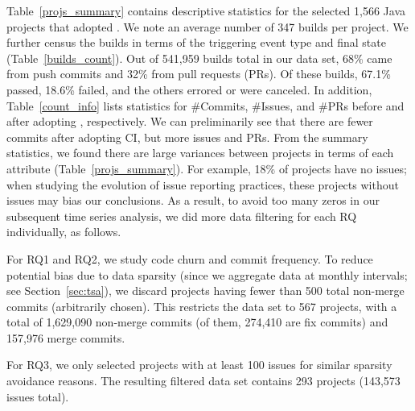 Table~\ref{projs_summary} contains descriptive statistics for the selected 
1,566 Java projects that adopted \Tvis. 
We note an average number of 347 builds per project. 
We further census the builds in terms of the triggering event type and final 
state (Table~\ref{builds_count}). 
Out of 541,959 builds total in our data set, 68\% came from push commits 
and 32\% from pull requests (PRs). 
Of these builds, 67.1\% passed, 18.6\% failed, and the others errored or were canceled. 
In addition, Table~\ref{count_info} lists statistics for \#Commits, \#Issues, 
and \#PRs before and after adopting \Tvis, respectively. 
We can preliminarily see that there are fewer commits 
after adopting CI, but more issues and PRs.
From the summary statistics, we found there are large variances between 
projects in terms of each attribute (Table~\ref{projs_summary}).
For example, 18\% of projects have no \GH issues;
when studying the evolution of issue reporting practices, these projects without 
issues may bias our conclusions. 
As a result, to avoid too many zeros in our subsequent time series analysis, 
we did more data filtering for each RQ individually, as follows.


For RQ1 and RQ2, we study code churn and commit frequency. 
To reduce potential bias due to data sparsity (since we aggregate data at 
monthly intervals; see Section~\ref{sec:tsa}), we discard projects having 
fewer than 500 total non-merge commits (arbitrarily chosen).
This restricts the data set to 567 projects, with a 
total of 1,629,090 non-merge commits (of them, 274,410 are fix commits) 
and 157,976 merge commits.

For RQ3, we only selected projects with at least 100 issues for similar sparsity 
avoidance reasons. 
The resulting filtered data set contains 293 projects (143,573 \GH issues total).

